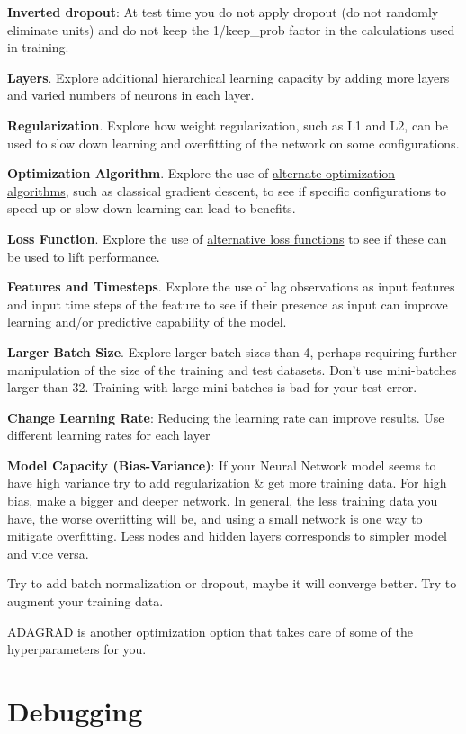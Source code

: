 \documentclass[]{book}
\begin{document}
\textbf{Inverted dropout}: At test time you do not apply dropout (do not randomly eliminate units) and do not keep the 1/keep\_prob factor in the calculations used in training.

\textbf{Layers}. Explore additional hierarchical learning capacity by adding more layers and varied numbers of neurons in each layer.

\textbf{Regularization}. Explore how weight regularization, such as L1 and L2, can be used to slow down learning and overfitting of the network on some configurations.

\textbf{Optimization Algorithm}. Explore the use of \href{https://keras.io/optimizers/}{alternate optimization algorithms}, such as classical gradient descent, to see if specific configurations to speed up or slow down learning can lead to benefits.

\textbf{Loss Function}. Explore the use of \href{https://keras.io/objectives/}{alternative loss functions} to see if these can be used to lift performance.

\textbf{Features and Timesteps}. Explore the use of lag observations as input features and input time steps of the feature to see if their presence as input can improve learning and/or predictive capability of the model.

\textbf{Larger Batch Size}. Explore larger batch sizes than 4, perhaps requiring further manipulation of the size of the training and test datasets. Don't use mini-batches larger than 32. Training with large mini-batches is bad for your test error.

\textbf{Change Learning Rate}: Reducing the learning rate can improve results. Use different learning rates for each layer

\textbf{Model Capacity (Bias-Variance)}: If your Neural Network model seems to have high variance try to add regularization \& get more training data. For high bias, make a bigger and deeper network. In general, the less training data you have, the worse overfitting will be, and using a small network is one way to mitigate overfitting. Less nodes and hidden layers corresponds to simpler model and vice versa.

Try to add batch normalization or dropout, maybe it will converge better. Try to augment your training data.

ADAGRAD is another optimization option that takes care of some of the hyperparameters for you.

\hypertarget{debugging}{%
\section{Debugging}\label{debugging}}
\end{document}
